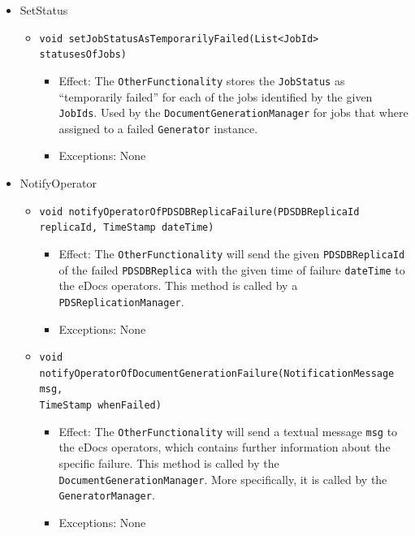 \documentclass[a4paper,10pt]{article}
\begin{document}
\begin{itemize}
    \item SetStatus
    \begin{itemize}
        \item \texttt{void setJobStatusAsTemporarilyFailed(List<JobId> statusesOfJobs)}
        \begin{itemize}
            \item Effect: The \texttt{OtherFunctionality} stores the \texttt{JobStatus} as ``temporarily failed'' for each of the jobs identified by the given \texttt{JobIds}. Used by the \texttt{DocumentGenerationManager} for jobs that where assigned to a failed \texttt{Generator} instance.
            \item Exceptions: None
        \end{itemize}
    \end{itemize}
    
    \item NotifyOperator
    \begin{itemize}
        \item \texttt{void notifyOperatorOfPDSDBReplicaFailure(PDSDBReplicaId replicaId, TimeStamp dateTime)}
        \begin{itemize}
            \item Effect: The \texttt{OtherFunctionality} will send the given \texttt{PDSDBReplicaId} of the failed \texttt{PDSDBReplica} with the given time of failure \texttt{dateTime} to the eDocs operators. This method is called by a \texttt{PDSReplicationManager}.
            \item Exceptions: None
        \end{itemize}
        
        \item \texttt{void notifyOperatorOfDocumentGenerationFailure(NotificationMessage msg,\\ TimeStamp whenFailed)}
        \begin{itemize}
            \item Effect: The \texttt{OtherFunctionality} will send a textual message \texttt{msg} to the eDocs operators, which contains further information about the specific failure. This method is called by the \texttt{DocumentGenerationManager}. More specifically, it is called by the \texttt{GeneratorManager}.
            \item Exceptions: None
        \end{itemize}
    \end{itemize}

\end{itemize}
\end{document}

